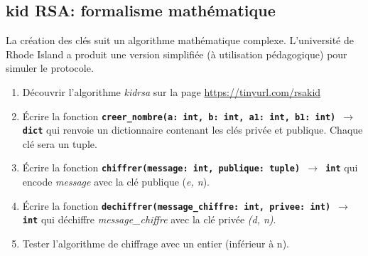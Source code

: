 \documentclass[a4paper,11pt]{article}
\begin{document}
\subsection{kid RSA: formalisme mathématique}
La création des clés suit un algorithme mathématique complexe. L'université de Rhode Island a produit une version simplifiée (à utilisation pédagogique) pour simuler le protocole.
\begin{activite}
\begin{enumerate}
    \item Découvrir l'algorithme \emph{kidrsa} sur la page \url{https://tinyurl.com/rsakid}
    \item Écrire la fonction \textbf{\texttt{creer\_nombre(a: int, b: int, a1: int, b1: int) $\rightarrow$ dict}} qui renvoie un dictionnaire contenant les clés privée et publique. Chaque clé sera un tuple.
    \item Écrire la fonction \textbf{\texttt{chiffrer(message: int, publique: tuple) $\rightarrow$ int}} qui encode \emph{message} avec la clé publique (\emph{e, n}).
    \item Écrire la fonction \textbf{\texttt{dechiffrer(message\_chiffre: int, privee: int) $\rightarrow$ int}} qui déchiffre \emph{message\_chiffre} avec la clé privée \emph{(d, n)}.
    \item Tester l'algorithme de chiffrage avec un entier (inférieur à n).
\end{enumerate}
\end{activite}

\end{document}
